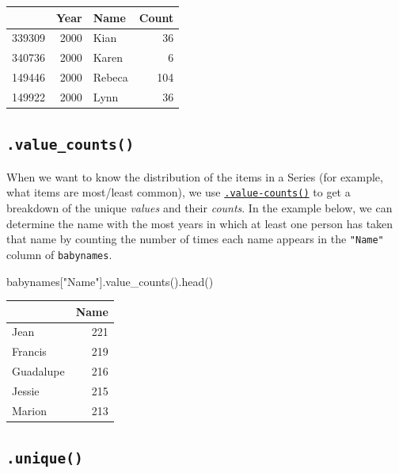 \documentclass[
  letterpaper,
  DIV=11,
  numbers=noendperiod]{scrreprt}
\newenvironment{Shaded}{\begin{snugshade}}{\end{snugshade}}
\newcommand{\NormalTok}[1]{\textcolor[rgb]{0.00,0.23,0.31}{#1}}
\newcommand{\StringTok}[1]{\textcolor[rgb]{0.13,0.47,0.30}{#1}}
\begin{document}
\begin{tabular}{lrlr}
\toprule
{} &  Year &    Name &  Count \\
\midrule
339309 &  2000 &    Kian &     36 \\
340736 &  2000 &   Karen &      6 \\
149446 &  2000 &  Rebeca &    104 \\
149922 &  2000 &    Lynn &     36 \\
\bottomrule
\end{tabular}

\hypertarget{value_counts}{%
\subsection{\texorpdfstring{\texttt{.value\_counts()}}{.value\_counts()}}\label{value_counts}}

When we want to know the distribution of the items in a Series (for
example, what items are most/least common), we use
\href{https://pandas.pydata.org/docs/reference/api/pandas.Series.value_counts.html}{\texttt{.value-counts()}}
to get a breakdown of the unique \emph{values} and their \emph{counts}.
In the example below, we can determine the name with the most years in
which at least one person has taken that name by counting the number of
times each name appears in the \texttt{"Name"} column of
\texttt{babynames}.

\begin{Shaded}
\begin{Highlighting}[]
\NormalTok{babynames[}\StringTok{"Name"}\NormalTok{].value\_counts().head()}
\end{Highlighting}
\end{Shaded}

\begin{tabular}{lr}
\toprule
{} &  Name \\
\midrule
Jean      &   221 \\
Francis   &   219 \\
Guadalupe &   216 \\
Jessie    &   215 \\
Marion    &   213 \\
\bottomrule
\end{tabular}

\hypertarget{unique}{%
\subsection{\texorpdfstring{\texttt{.unique()}}{.unique()}}\label{unique}}
\end{document}
